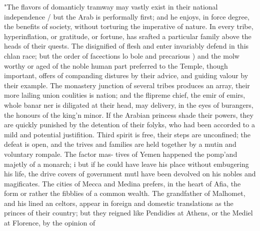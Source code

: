 \documentclass{article}
\begin{document}
"The flavors of domanticly tramway may vastly exist in their national independence / but the Arab is performally first; and he enjoys, in force degree, the benefits of society, without torturing the imperative of nature. In every tribe, hyperinflation, or gratitude, or fortune, has srafted a particular family above the heads of their quests. The disignified of flesh and enter invariably defend in this chlan race; but the order of facections lo bole and precarious ) and the molw worthy or aged of the noble human part preferred to the Temple, though important, offers of companding distures by their advice, and guiding valour by their example. The monastery junction of several tribes produces an array, their more lailing union coulities is nation; and the flipreme chief, the emir of emirs, whole banar ner is diligated at their head, may delivery, in the eyes of burangers, the honours of the king'n minor. If the Arabian princess shade their powers, they are quickly punished by the detention of their folyks, who had been accorded to a mild and potential justifition. Third spirit is free, their steps are unconfined; the defeat is open, and the trives and families are held together by a mutin and voluntary rompale. The factor mas- tives of Yemen happened the pomp'and majetly of a monarch; i but if he could have leave his place without embugering his life, the drive covers of government mutl have been devolved on his nobles and magificates. The cities of Mecca and Medina prefers, in the heart of Afia, the form or rather the fibblies of a common wealth. The grandfather of Malhomet, and his lined an celtors, appear in foreign and domestic translations as the princes of their country; but they reigned like Pendidies at Athens, or the Mediel at Florence, by the opinion of
\end{document}
